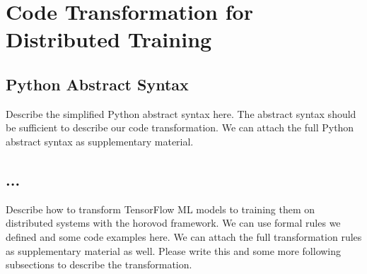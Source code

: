 \section{Code Transformation for Distributed Training}\label{sec:trans}
\subsection{Python Abstract Syntax}\label{sec:pysyn}
Describe the simplified Python abstract syntax here. 
The abstract syntax should be sufficient to describe our code transformation. 
We can attach the full Python abstract syntax as supplementary material.

\subsection{...}
Describe how to transform TensorFlow ML models to training them on distributed
systems with the horovod framework. We can use formal rules we defined and some
code examples here. We can attach the full transformation rules as
supplementary material as well.  Please write this and some more following
subsections to describe the transformation.
